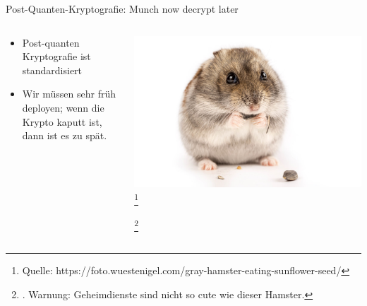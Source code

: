 \documentclass{rosenpass-beamer}
\begin{document}
\begin{frame}{Post-Quanten-Kryptografie: Munch now decrypt later}
\begin{columns}[onlytextwidth]
\begin{column}{.60\textwidth}
\begin{itemize}
    \item Post-quanten Kryptografie ist standardisiert
    \item Wir müssen sehr früh deployen; wenn die Krypto kaputt ist, dann ist es zu spät.
\end{itemize}
\end{column}

\begin{column}{.30\textwidth}
  \includegraphics[height=.6\textheight]{assets/gray-hamster-eating-sunflower-seed.jpeg}
  \footnote{Quelle: https://foto.wuestenigel.com/gray-hamster-eating-sunflower-seed/}
  
  \footnote{. Warnung: Geheimdienste sind nicht so cute wie dieser Hamster.}
\end{column}
\end{columns}
\end{frame}
\end{document}
